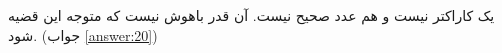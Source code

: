 \section{}
\paragraph{}\label{hint:337}
 یک کاراکتر نیست و  هم عدد صحیح نیست.  آن قدر باهوش نیست که متوجه این قضیه شود. (جواب \ref{answer:20})